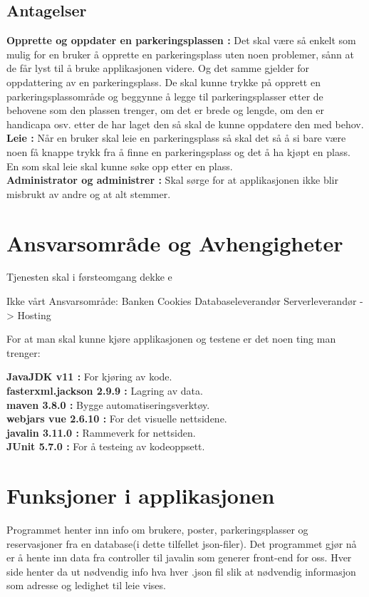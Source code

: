 \documentclass[12pt]{article}
\begin{document}
    \subsection{Antagelser}
        \textbf{Opprette og oppdater en parkeringsplassen :} Det skal være så enkelt som mulig for en bruker å opprette en parkeringsplass uten noen problemer, sånn at de får lyst til å bruke applikasjonen videre. Og det samme gjelder for oppdattering av en parkeringsplass. De skal kunne trykke på opprett en parkeringsplassområde og beggynne å legge til parkeringsplasser etter de behovene som den plassen trenger, om det er brede og lengde, om den er handicapa osv. etter de har laget den så skal de kunne oppdatere den med behov.
        \\\textbf{Leie :} Når en bruker skal leie en parkeringsplass så skal det så å si bare være noen få knappe trykk fra å finne en parkeringsplass og det å ha kjøpt en plass. En som skal leie skal kunne søke opp etter en plass.
        \\\textbf{Administrator og administrer :} Skal sørge for at applikasjonen ikke blir misbrukt av andre og at alt stemmer.


\section{Ansvarsområde og Avhengigheter}
Tjenesten skal i førsteomgang dekke e 

Ikke vårt Ansvarsområde:
Banken
Cookies
Databaseleverandør
Serverleverandør -> Hosting


For at man skal kunne kjøre applikasjonen og testene er det noen ting man trenger:

\textbf{JavaJDK v11 : } For kjøring av kode.
\\\textbf{fasterxml.jackson 2.9.9 :} Lagring av data.
\\\textbf{maven 3.8.0 :} Bygge automatiseringsverktøy.
\\\textbf{webjars vue 2.6.10 :} For det visuelle nettsidene.
\\\textbf{javalin 3.11.0 :} Rammeverk for nettsiden.
\\\textbf{JUnit 5.7.0 :} For å testeing av kodeoppsett.


\section{Funksjoner i applikasjonen}

Programmet henter inn info om brukere, poster, parkeringsplasser og reservasjoner fra en database(i dette tilfellet json-filer). Det programmet gjør nå er å hente inn data fra controller til javalin som generer front-end for oss. Hver side henter da ut nødvendig info hva hver .json fil slik at nødvendig informasjon som adresse og ledighet til leie vises.
\end{document}
